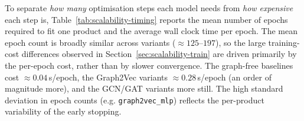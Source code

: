 To separate \emph{how many} optimisation steps each model needs from \emph{how
expensive} each step is, Table~\ref{tab:scalability-timing} reports the mean number of
epochs required to fit one product and the average wall clock time per epoch.
The mean epoch count is broadly similar across variants ($\approx 125$--$197$), so the
large training-cost differences observed in Section~\ref{sec:scalability-train} are
driven primarily by the per-epoch cost, rather than by slower convergence. The
graph-free baselines cost $\approx 0.04$\,s/epoch, the Graph2Vec variants
$\approx 0.28$\,s/epoch (an order of magnitude more), and the GCN/GAT variants more
still. The high standard deviation in epoch counts (e.g. \texttt{graph2vec\_mlp})
reflects the per-product variability of the early stopping. 
\begin{table}[ht]
\centering
\caption{Per-model scalability statistics over $N=500$ products: mean and std of
per-product training time, mean per-product inference time, and cumulative totals.}
\label{tab:scalability-timing}
\begingroup
\small
\setlength{\tabcolsep}{4pt} %
\endgroup
\end{table}


